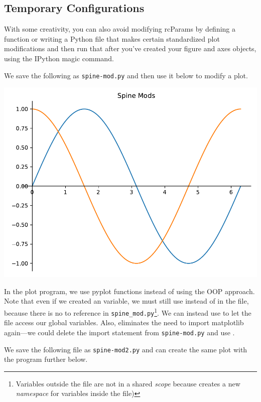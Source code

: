 \subsection{Temporary Configurations}


With some creativity, you can also avoid modifying rcParams by defining a function or writing a Python file that makes certain standardized plot modifications and then run that after you've created your figure and axes objects, using the IPython  magic command. 

We save the following as \texttt{spine-mod.py} and then use it below to modify a plot. 



\begin{center}
    \includegraphics[width = .7\textwidth]{figures/proseplots/spine-mod-ex.pdf}
\end{center}

In the plot program, we use pyplot functions instead of using the OOP approach. Note that even if we created an  variable, we must still use  instead of  in the file, because there is no  to reference in \texttt{spine\_mod.py}\footnote{Variables outside the file are not in a shared \emph{scope} because  creates a new \emph{namespace} for variables inside the file)}. We can instead use  to let the file access our global variables. Also,  eliminates the need to import matplotlib again---we could delete the import statement from \texttt{spine-mod.py} and use . 

We save the following file as \texttt{spine-mod2.py} and can create the same plot with the program further below. 

